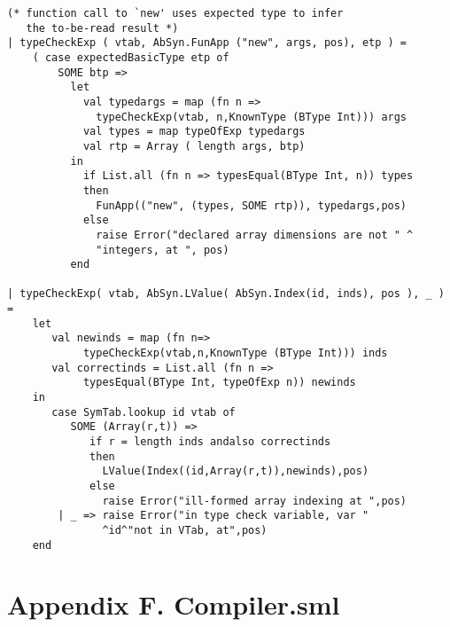 \documentclass[12pt,a4paper,english]{article}
\begin{document}
\begin{lstlisting}[caption=changes in type.sml for task 3 and 4.]
(* function call to `new' uses expected type to infer
   the to-be-read result *)
| typeCheckExp ( vtab, AbSyn.FunApp ("new", args, pos), etp ) =
    ( case expectedBasicType etp of
        SOME btp => 
          let 
            val typedargs = map (fn n => 
		      typeCheckExp(vtab, n,KnownType (BType Int))) args
            val types = map typeOfExp typedargs
            val rtp = Array ( length args, btp)
          in
            if List.all (fn n => typesEqual(BType Int, n)) types
            then 
              FunApp(("new", (types, SOME rtp)), typedargs,pos)
            else 
              raise Error("declared array dimensions are not " ^
			  "integers, at ", pos)
          end

| typeCheckExp( vtab, AbSyn.LValue( AbSyn.Index(id, inds), pos ), _ ) =
    let
       val newinds = map (fn n=>
			typeCheckExp(vtab,n,KnownType (BType Int))) inds
       val correctinds = List.all (fn n => 
			typesEqual(BType Int, typeOfExp n)) newinds
    in
       case SymTab.lookup id vtab of
          SOME (Array(r,t)) => 
             if r = length inds andalso correctinds 
             then
               LValue(Index((id,Array(r,t)),newinds),pos)
             else
               raise Error("ill-formed array indexing at ",pos)
        | _ => raise Error("in type check variable, var " 
			   ^id^"not in VTab, at",pos)
    end
\end{lstlisting}

\newpage
\section{Appendix F. Compiler.sml}
\end{document}

